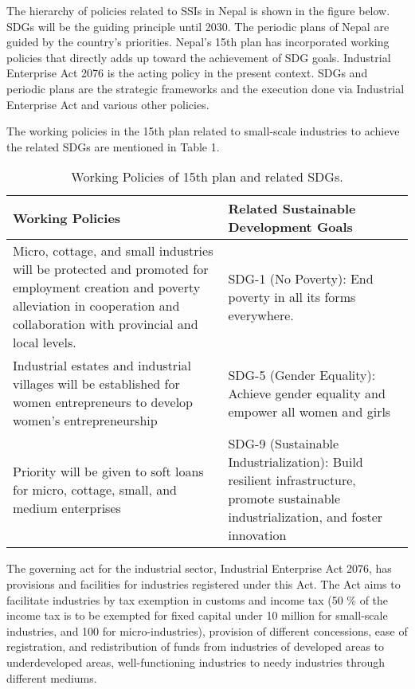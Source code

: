 \documentclass[a4paper]{article}
\begin{document}
The hierarchy of policies related to SSIs in Nepal is shown in the figure below. SDGs will be the guiding principle until 2030. The periodic plans of Nepal are guided by the country’s priorities. Nepal’s 15th plan has incorporated working policies that directly adds up toward the achievement of SDG goals. Industrial Enterprise Act 2076 is the acting policy in the present context. SDGs and periodic plans are the strategic frameworks and the execution done via Industrial Enterprise Act and various other policies.

The working policies in the 15th plan related to small-scale industries to achieve the related SDGs are mentioned in Table 1.

\begin{table}[h]
\centering
\begin{tabular}{p{3in}p{3in}}\hline
Working Policies & Related Sustainable Development Goals\\\hline
Micro, cottage, and small industries will be protected and promoted for employment creation and poverty alleviation in cooperation and collaboration with provincial and local levels. &
SDG-1 (No Poverty): End poverty in all its forms everywhere.\\\hline
Industrial estates and industrial villages will be established for women entrepreneurs to develop women’s entrepreneurship &
SDG-5 (Gender Equality): Achieve gender equality and empower all women and girls\\\hline
Priority will be given to soft loans for micro, cottage, small, and medium enterprises &
SDG-9 (Sustainable Industrialization): Build resilient infrastructure, promote sustainable industrialization, and foster innovation\\\hline
\end{tabular}
\caption{Working Policies of 15th plan and related SDGs.}
\end{table}

The governing act for the industrial sector, Industrial Enterprise Act 2076, has provisions and facilities for industries registered under this Act. The Act aims to facilitate industries by tax exemption in customs and income tax (50 \% of the income tax is to be exempted for fixed capital under 10 million for small-scale industries, and 100 for micro-industries), provision of different concessions, ease of registration, and redistribution of funds from industries of developed areas to underdeveloped areas, well-functioning industries to needy industries through different mediums. 
\end{document}
